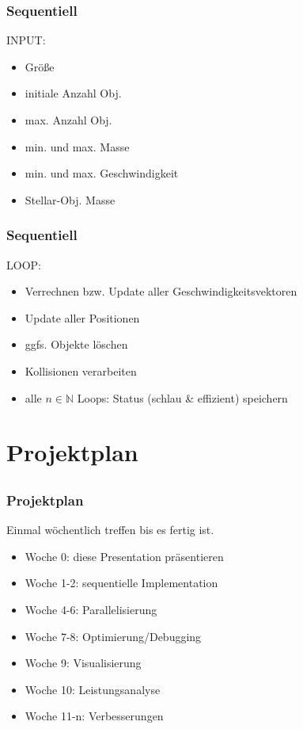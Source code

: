 \documentclass{beamer}
\begin{document}

\begin{frame}
    \frametitle{Sequentiell}
    INPUT:
        \begin{itemize}
            \item Größe
            \item initiale Anzahl Obj.
            \item max. Anzahl Obj.
            \item min. und max. Masse
            \item min. und max. Geschwindigkeit
            \item Stellar-Obj. Masse
        \end{itemize}
\end{frame}


\begin{frame}
    \frametitle{Sequentiell}
    LOOP:
        \begin{itemize}
            \item Verrechnen bzw. Update aller Geschwindigkeitsvektoren
            \item Update aller Positionen
            \item ggfs. Objekte löschen
            \item Kollisionen verarbeiten
            \item alle $n \in \mathbb{N}$ Loops: Status (schlau \& effizient) speichern
        \end{itemize}

\end{frame}


\section{Projektplan}
\subsection{}


\begin{frame}
    \frametitle{Projektplan}
    Einmal wöchentlich treffen bis es fertig ist.
    \begin{itemize}
        \item Woche 0: diese Presentation präsentieren
        \item Woche 1-2: sequentielle Implementation
        \item Woche 4-6: Parallelisierung
        \item Woche 7-8: Optimierung/Debugging
        \item Woche 9: Visualisierung
        \item Woche 10: Leistungsanalyse
        \item Woche 11-n: Verbesserungen
    \end{itemize}
\end{frame}
\end{document}
